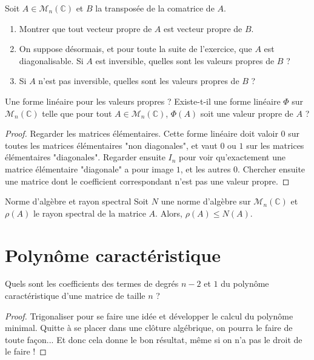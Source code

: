 \documentclass[french,a4paper]{article}
\newcommand{\C}{\mathbb{C}}
\theoremstyle{plain}
\theoremstyle{definition}
\theoremstyle{remark}
\begin{document}
\begin{ex}{}
	Soit $A\in\mathcal{M}_n(\C)$ et $B$ la transposée de la comatrice de $A$.
	\begin{enumerate}
		\item Montrer que tout vecteur propre de $A$ est vecteur propre de $B$.
		\item On suppose désormais, et pour toute la suite de l'exercice, que $A$ est diagonalisable. Si $A$ est inversible, quelles sont les valeurs propres de $B$ ?
		\item Si $A$ n'est pas inversible, quelles sont les valeurs propres de $B$ ?
	\end{enumerate}
\end{ex}

\begin{ex}{Une forme linéaire pour les valeurs propres ?}
	Existe-t-il une forme linéaire $\Phi$ sur $\mathcal{M}_n(\C)$ telle que pour tout $A\in\mathcal{M}_n(\C)$, $\Phi(A)$ soit une valeur propre de $A$ ?
\end{ex}
\begin{proof}
	Regarder les matrices élémentaires. Cette forme linéaire doit valoir $0$ sur toutes les matrices élémentaires "non diagonales", et vaut $0$ ou $1$ sur les matrices élémentaires "diagonales". Regarder ensuite $I_n$ pour voir qu'exactement une matrice élémentaire "diagonale" a pour image $1$, et les autres $0$. Chercher ensuite une matrice dont le coefficient correspondant n'est pas une valeur propre.
\end{proof}

\begin{ex}{Norme d'algèbre et rayon spectral}
	Soit $N$ une norme d'algèbre sur $\mathcal{M}_n(\C)$ et $\rho(A)$ le rayon spectral de la matrice $A$. Alors, $\rho(A)\leqslant N(A)$.
\end{ex}

\section{Polynôme caractéristique}

\begin{ex}{}
	Quels sont les coefficients des termes de degrés $n-2$ et $1$ du polynôme caractéristique d'une matrice de taille $n$ ?
\end{ex}
\begin{proof}
	Trigonaliser pour se faire une idée et développer le calcul du polynôme minimal. Quitte à se placer dans une clôture algébrique, on pourra le faire de toute façon... Et donc cela donne le bon résultat, même si on n'a pas le droit de le faire !
\end{proof}
\end{document}
